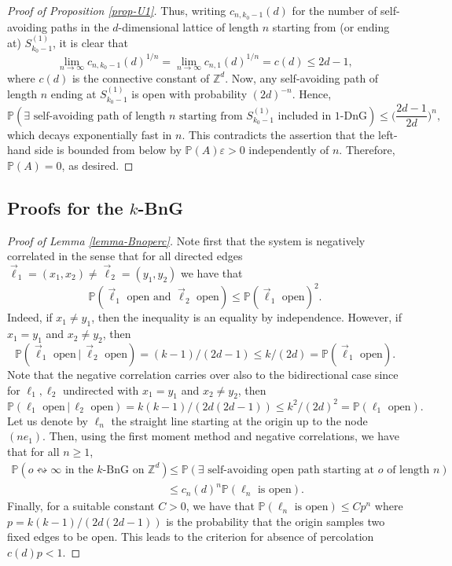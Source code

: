 \documentclass[a4paper, oneside, 11pt]{amsart}
\theoremstyle{definition}
\renewcommand{\P}{\mathbb{P}}
\newcommand{\1}{\mathbbm{1}}
\newcommand{\0}{\mathbf{o}}
\newcommand{\Z}{\mathbb{Z}}
\numberwithin{equation}{section}
\begin{document}
\begin{proof}[Proof of Proposition \ref{prop-U1}]
Thus, writing $c_{n,k_0-1}(d)$ for the number of self-avoiding paths in the $d$-dimensional lattice of length $n$ starting from (or ending at) $S^{(1)}_{k_0-1}$, it is clear that
\[ \lim_{n\to\infty} c_{n,k_0-1}(d)^{1/n} = \lim_{n\to\infty} c_{n,1}(d)^{1/n}=c(d) \leq 2d-1, \]
where $c(d)$ is the connective constant of $\Z^d$. Now, any self-avoiding path of length $n$ ending at $S^{(1)}_{k_0-1}$ is open with probability $(2d)^{-n}$. Hence,
\[ \P(\exists\text{ self-avoiding path of length $n$ starting from $S^{(1)}_{k_0-1}$ included in $1$-DnG}) \leq \Big( \frac{2d-1}{2d} \Big)^n, \]
which decays exponentially fast in $n$. This contradicts the assertion that the left-hand side is bounded from below by $\P(A)\varepsilon>0$ independently of $n$. Therefore, $\P(A)=0$, as desired.
\end{proof}


\subsection{Proofs for the $k$-BnG}
\begin{proof}[Proof of Lemma \ref{lemma-Bnoperc}]
Note first that the system is negatively correlated in the sense that for all directed edges $\vec{\ell}_1=(x_1,x_2)\neq\vec{\ell}_2=(y_1,y_2)$ we have that
$$
\mathbb P(\vec{\ell}_1\text{ open and }\vec{\ell}_2\text{ open})\le \mathbb P(\vec{\ell}_1\text{ open})^2.
$$
Indeed, if $x_1\neq y_1$, then the inequality is an equality by independence. However, if $x_1=y_1$ and $x_2\neq y_2$, then 
$$
\mathbb P(\vec{\ell}_1\text{ open}\,|\,\vec{\ell}_2\text{ open})=(k-1)/(2d-1)\le k/(2d)=\mathbb P(\vec{\ell}_1\text{ open}).
$$
Note that the negative correlation carries over also to the bidirectional case since for $\ell_1,\ell_2$ undirected with $x_1=y_1$ and $x_2\neq y_2$, then 
$$
\mathbb P(\ell_1\text{ open}\,|\,\ell_2\text{ open})=k(k-1)/(2d(2d-1))\le k^2/(2d)^2=\mathbb P(\ell_1\text{ open}).
$$
Let us denote by $\ell_n$ the straight line starting at the origin up to the node $(ne_1)$. Then, using the first moment method and negative correlations, we have that for all $n\ge 1$,
\begin{align*}
\P(o\leftrightsquigarrow \infty \text{ in the $k$-BnG on }\Z^d)&\le \P(\exists\text{ self-avoiding open path starting at }o\text{ of length }n)\\
&\le c_n(d)^n\P(\ell_n\text{ is open}).
\end{align*}
Finally, for a suitable constant $C>0$, we have that $\P(\ell_n\text{ is open})\le C p^n$ where $p=k(k-1)/(2d(2d-1))$ is the probability that the origin samples two fixed edges to be open. This leads to the criterion for absence of percolation $c(d)p<1$.
\end{proof}
\end{document}
